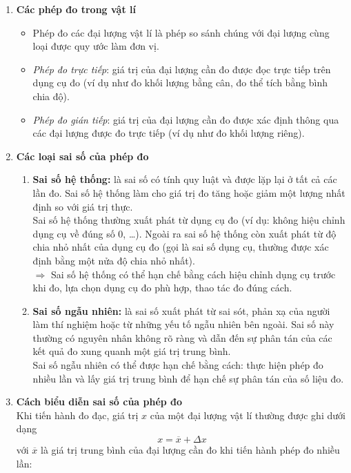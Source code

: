 \begin{enumerate}[label=\bfseries\Roman*.]
\begin{enumerate}[label=\bfseries\arabic*.]
\begin{enumerate}[label=\bfseries\arabic*.]
	\item \textbf{Các phép đo trong vật lí}
	\begin{itemize}
		\item Phép đo các đại lượng vật lí là phép so sánh chúng với đại lượng cùng loại được quy ước làm đơn vị.
		\item \textit{Phép đo trực tiếp}: giá trị của đại lượng cần đo được đọc trực tiếp trên dụng cụ đo (ví dụ như đo khối lượng bằng cân, đo thể tích bằng bình chia độ).
		\item \textit{Phép đo gián tiếp}: giá trị của đại lượng cần đo được xác định thông qua các đại lượng được đo trực tiếp (ví dụ như đo khối lượng riêng).
	\end{itemize}
\item \textbf{Các loại sai số của phép đo}\\
\begin{enumerate}[label=\bfseries\alph*)]
	\item \textbf{Sai số hệ thống:} là sai số có tính quy luật và được lặp lại ở tất cả các lần đo. Sai số hệ thống làm cho giá trị đo tăng hoặc giảm một lượng nhất định so với giá trị thực.\\
	Sai số hệ thống thường xuất phát từ dụng cụ đo (ví dụ: không
	hiệu chỉnh dụng cụ về đúng số 0, \dots). Ngoài ra sai số hệ thống còn xuất phát từ độ chia nhỏ nhất của dụng cụ đo (gọi là sai số dụng cụ, thường được xác định bằng một nửa độ chia nhỏ nhất).\\
	$\Rightarrow$ Sai số hệ thống có thể hạn chế bằng cách hiệu chỉnh dụng cụ trước khi đo, lựa chọn dụng cụ đo phù hợp, thao tác đo đúng cách.
	\item \textbf{Sai số ngẫu nhiên:} là sai số xuất phát từ sai sót, phản xạ của người làm thí nghiệm hoặc từ những yếu tố ngẫu nhiên bên ngoài. Sai số này thường có nguyên nhân không rõ ràng và dẫn đến sự phân tán của các kết quả đo xung quanh một giá trị trung bình.\\
	Sai số ngẫu nhiên có thể được hạn chế bằng cách: thực hiện phép đo nhiều lần và lấy giá trị trung bình để hạn chế sự phân tán
	của số liệu đo.
\end{enumerate}
\item \textbf{Cách biểu diễn sai số của phép đo}\\
Khi tiến hành đo đạc, giá trị $x$ của một đại lượng vật lí thường được ghi dưới dạng
$$x=\overline{x}+\Delta x$$
với $\overline{x}$ là giá trị trung bình của đại lượng cần đo khi tiến hành phép đo nhiều lần:

\end{enumerate}
\end{enumerate}
\end{enumerate}
